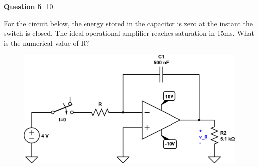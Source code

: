 \documentclass[12pt]{article}
\begin{document}
{\bf Question 5} [10] %

For the circuit below, the energy stored in the capacitor is zero at the instant the switch is closed. The ideal operational amplifier reaches saturation in 15ms. What is the numerical value of R?

\begin{figure}[h!]
\begin{center}
 \includegraphics[scale=0.4]{p7_90.png}
\end{center}
\end{figure}
\end{document}
